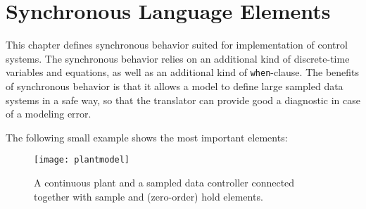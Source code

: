 \chapter{Synchronous Language Elements}\label{synchronous-language-elements}

This chapter defines synchronous behavior suited for implementation of control systems.
The synchronous behavior relies on an additional kind of discrete-time variables and equations, as well as an additional kind of \lstinline!when!-clause.
The benefits of synchronous behavior is that it allows a model to define large sampled data systems in a safe way, so that the translator can provide good a diagnostic in case of a modeling error.

The following small example shows the most important elements:
\begin{figure}[H]
  \begin{center}
    \texttt{[image: plantmodel]}
  \end{center}
  \caption{A continuous plant and a sampled data controller connected together with sample and (zero-order) hold elements.}
\end{figure}

